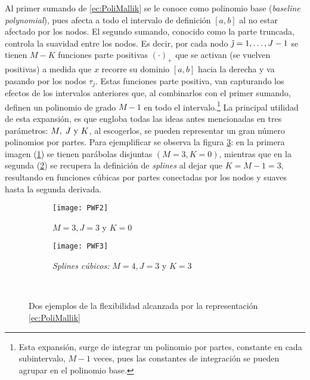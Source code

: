 \documentclass[../Main/Main.tex]{subfiles}
\begin{document}
Al primer sumando de \eqref{ec:PoliMallik} se le conoce como polinomio base (\textit{baseline polynomial}), pues afecta a todo el intervalo de definición $[a,b]$ al no estar afectado por los nodos. El segundo sumando, conocido como la parte truncada, controla la suavidad entre los nodos. Es decir, por cada nodo $\hat{\jmath} = 1,\ldots,J-1$ se tienen $M - K$ funciones parte positivas $(\cdot)_{+}$ que se activan (se vuelven positivas) a medida que $x$ recorre su dominio $[a,b]$ hacia la derecha y va pasando por los nodos $\tau_j$. Estas funciones parte positiva, van capturando los efectos de los intervalos anteriores que, al combinarlos con el primer sumando, definen un polinomio de grado $M - 1$ en todo el intervalo.\footnote{Esta expansión, surge de integrar un polinomio por partes, constante en cada subintervalo, $M-1$ veces, pues las constantes de integración se pueden agrupar en el polinomio base.} La principal utilidad de esta expansión, es que engloba todas las ideas antes mencionadas en tres parámetros: $M,\;J\text{ y }K$, al escogerlos, se pueden representar un gran número polinomios por partes. Para ejemplificar se observa la figura \ref{fig:PWFEjem}: en la primera imagen (\ref{fig:PWF2}) se tienen parábolas  disjuntas $(M = 3, K = 0)$, mientras que en la segunda (\ref{fig:PWF3}) se recupera la definición de \textit{splines} al dejar que $K = M - 1 = 3$, resultando en funciones cúbicas por partes conectadas por los nodos y suaves hasta la segunda derivada.  


\begin{figure}[h]
	\centering
	\begin{subfigure}[b]{0.47\textwidth}
    	\texttt{[image: PWF2]}
		\caption{$M = 3, J = 3$ y $K = 0$}
		\label{fig:PWF2}
	\end{subfigure}
	\hfill
    \begin{subfigure}[b]{0.47\textwidth}
        \texttt{[image: PWF3]}
        \caption{\textit{Splines cúbicos:} $M = 4, J = 3$ y $K = 3$}
        \label{fig:PWF3}
    \end{subfigure}\\
    \caption{Dos ejemplos de la flexibilidad alcanzada por la representación \eqref{ec:PoliMallik}}
    \label{fig:PWFEjem}
\end{figure}
\end{document}
